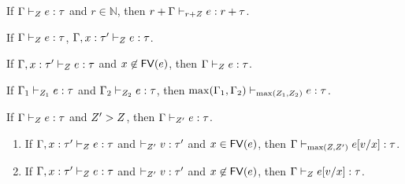\begin{thm}
  If $ \Gamma \vdash_{ Z} e : \tau $ and $r \in \mathbb{N}$,
  then $ r+\Gamma \vdash_{ r+ Z} e : r+ \tau $.
\end{thm}

\begin{thm}
  If $ \Gamma \vdash_{ Z} e : \tau $,  $ \Gamma,x : \tau' \vdash_{ Z} e : \tau $.
\end{thm}

\begin{thm}
  If $ \Gamma,x : \tau' \vdash_{ Z} e : \tau $ and $x \not
 \in \mathsf{FV} (e) $, then $ \Gamma  \vdash_{ Z} e : \tau $.
\end{thm}

\begin{thm}
  If $ \Gamma_1 \vdash_{ Z_1} e : \tau $ and $ \Gamma_2 \vdash_{ Z_2} e : \tau $,
  then $\max(\Gamma_1,\Gamma_2) \vdash_{\max( Z_1 , Z_2 )} e : \tau $.
\end{thm}

\begin{thm}
   If $ \Gamma \vdash_{ Z} e : \tau $ and $Z' >
   Z$, then $ \Gamma \vdash_{ Z'} e : \tau $.
\end{thm}

\begin{thm}[Substitution]
  \begin{enumerate} 
   \item If $ \Gamma,x : \tau' \vdash_{ Z} e : \tau $ and $
  \empty \tvdash{\nnatA'} \valr : \type'  $ and $ x \in \mathsf{FV} (e) $,  then  $\Gamma
  \vdash_{\max(Z,Z' )} e[v/x]  : \tau$. 
  \item If $ \Gamma,x : \tau' \vdash_{ Z} e : \tau $ and $
  \empty \tvdash{\nnatA'} \valr : \type'  $ and $ x \not \in \mathsf{FV} (e) $,  then  $\Gamma
  \vdash_{Z } e[v/x]  : \tau$.
  \end{enumerate}
\end{thm}

